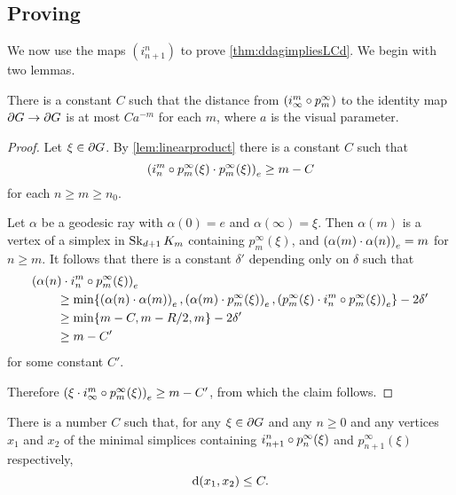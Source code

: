 \documentclass[a4paper]{article}
\begin{document}
\subsection{Proving }

We now use the maps $(i^n_{n+1})$ to prove \cref{thm:ddagimpliesLCd}. We begin
with two lemmas.

\begin{lemma}\label{lem:convergestoidentity}
  There is a constant $C$ such that the distance from $(i^m_\infty \composed 
  p^\infty_m)$ to the identity map $\boundary G\to\boundary G$ is at most 
  $Ca^{-m}$ for each $m$, where $a$ is the visual parameter.
\end{lemma}

\begin{proof}
  Let $\xi \in \boundary G$. By \cref{lem:linearproduct} there is a 
  constant $C$ such that 
  \begin{equation*}
    \gromov{e}{i^m_n\composed p^\infty_m(\xi)}{p^\infty_m(\xi)} \geq m - C
  \end{equation*} 
  for each $n\geq m\geq n_0$. 

  Let $\alpha$ be a geodesic ray with $\alpha(0) = e$ and $\alpha(\infty) = 
  \xi$. Then $\alpha(m)$ is a vertex of a simplex in $\Skel_{d+1}K_m$ containing 
  $p^\infty_m(\xi)$, and $\gromov{e}{\alpha(m)}{\alpha(n)} = m$ for $n\geq m$.
  It follows that there is a constant $\delta'$ depending only on $\delta$ such 
  that
  \begin{align*}
    \mathrlap{\gromov{e}{\alpha(n)}{i^m_n\composed p^\infty_m(\xi)}}\quad\quad &\\
          & \geq \min\{\gromov{e}{\alpha(n)}{\alpha(m)}, 
            \gromov{e}{\alpha(m)}{p^\infty_m(\xi)}, 
            \gromov{e}{p^\infty_m(\xi)}{i^m_n\composed p^\infty_m(\xi)}\} 
            - 2\delta' \\
          &\geq \min\{m - C, m - R/2, m\} - 2\delta' \\
          &\geq m - C'
  \end{align*}
  for some constant $C'$.

  Therefore $\gromov{e}{\xi}{i^m_\infty\composed p^\infty_m(\xi)} \geq m - C'$, 
  from which the claim follows.
\end{proof}

\begin{lemma}\label{lem:name_this}
  There is a number $C$ such that, for any $\xi \in \boundary G$ and any $n
  \geq 0$ and any vertices $x_1$ and $x_2$ of the minimal simplices containing
  $i^n_{n+1}\composed p^\infty_n(\xi)$ and $p^\infty_{n+1}(\xi)$ respectively,
  \begin{equation*}
    \dist(x_1, x_2) \leq C.
  \end{equation*}
\end{lemma}
\end{document}
